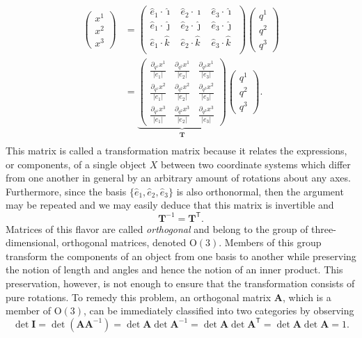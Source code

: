 \documentclass[11pt,dvipsnames]{thesis}
\begin{document}
\begin{align}
\begin{pmatrix}x^1 \\ x^2 \\ x^3\end{pmatrix} &= \begin{pmatrix}\hat{e}_1 \cdot \hat{\imath} & \hat{e}_2 \cdot \hat{\imath} & \hat{e}_3 \cdot \hat{\imath} \\ \hat{e}_1 \cdot \hat{\jmath} & \hat{e}_2 \cdot \hat{\jmath} & \hat{e}_3 \cdot \hat{\jmath} \\ \hat{e}_1 \cdot \hat{k} & \hat{e}_2 \cdot \hat{k} & \hat{e}_3 \cdot \hat{k} \\\end{pmatrix} \begin{pmatrix}q^1 \\ q^2 \\ q^3\end{pmatrix} \\
&= \underbrace{\begin{pmatrix}\frac{\partial_{q^1}x^1}{|e_1|} & \frac{\partial_{q^2}x^1}{|e_2|} & \frac{\partial_{q^3}x^1}{|e_3|} \\ \frac{\partial_{q^1}x^2}{|e_1|} & \frac{\partial_{q^2}x^2}{|e_2|} & \frac{\partial_{q^3}x^2}{|e_3|} \\ \frac{\partial_{q^1}x^3}{|e_1|} & \frac{\partial_{q^2}x^3}{|e_2|} & \frac{\partial_{q^3}x^3}{|e_3|}\end{pmatrix}}_{\mathbf T} \begin{pmatrix}q^1 \\ q^2 \\ q^3\end{pmatrix}.\\
\end{align}
This matrix is called a transformation matrix because it relates the expressions, or components, of a single object $X$ between two coordinate systems which differ from one another in general by an arbitrary amount of rotations about any axes. Furthermore, since the basis $\{\hat{e}_1, \hat{e}_2, \hat{e}_3\}$ is also orthonormal, then the argument may be repeated and we may easily deduce that this matrix is invertible and
\begin{equation}
\mathbf{T}^{-1} = \mathbf{T}^\mathsf{T}. \label{eq:O3}
\end{equation}
Matrices of this flavor are called \textit{orthogonal} and belong to the group of three-dimensional, orthogonal matrices, denoted $\mathrm{O}(3)$.
Members of this group transform the components of an object from one basis to another while preserving the notion of length and angles and hence the notion of an inner product. This preservation, however, is not enough to ensure that the transformation consists of pure rotations. To remedy this problem, an orthogonal matrix $\mathbf{A}$, which is a member of $\mathrm{O}(3)$, can be immediately classified into two categories by observing
\begin{equation}
\det \mathbf{I} = \det(\mathbf{A} \mathbf{A}^{-1}) = \det\mathbf{A} \det\mathbf{A}^{-1} = \det \mathbf{A} \det \mathbf{A}^{\!\mathsf{T}} = \det\mathbf{A} \det\mathbf{A} = 1.
\end{equation}
\end{document}
